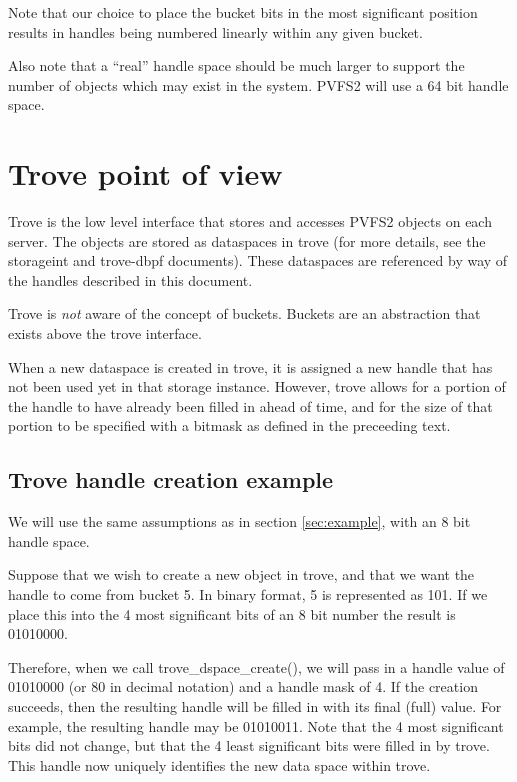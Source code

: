 \documentclass[12pt]{article} %
\begin{document}
Note that our choice to place the bucket bits in the most significant
position results in handles being numbered linearly within any given bucket.

Also note that a ``real'' handle space should be much larger to support
the number of objects which may exist in the system.  PVFS2
will use a 64 bit handle space.

\section{Trove point of view}

Trove is the low level interface that stores and accesses PVFS2 objects
on each server.  The objects are stored as dataspaces in trove (for more
details, see the storageint and trove-dbpf documents).  These dataspaces
are referenced by way of the handles described in this document.

Trove is \emph{not} aware of the concept of buckets.  Buckets are an
abstraction that exists above the trove interface.

When a new dataspace is created in trove, it is assigned a new handle
that has not been used yet in that storage instance.  However, trove
allows for a portion of the handle to have already been filled in ahead
of time, and for the size of that portion to be specified with a bitmask
as defined in the preceeding text.

\subsection{Trove handle creation example}

We will use the same assumptions as in section \ref{sec:example}, with
an 8 bit handle space.

Suppose that we wish to create a new object in trove, and that we want
the handle to come from bucket 5.  In binary format, 5 is represented as
101.  If we place this into the 4 most significant bits of an 8 bit
number the result is 01010000.

Therefore, when we call trove\_dspace\_create(), we will pass in a handle
value of 01010000 (or 80 in decimal notation) and a handle mask of 4.
If the creation succeeds, then the resulting handle will be filled in
with its final (full) value.  For example, the resulting handle may be
01010011.  Note that the 4 most significant bits did not change, but
that the 4 least significant bits were filled in by trove.  This handle
now uniquely identifies the new data space within trove.
\end{document}
